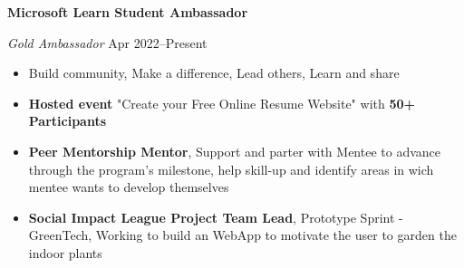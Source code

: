 \textbf{Microsoft Learn Student Ambassador \hfill } \par
\textit{Gold Ambassador}  \hfill Apr 2022--Present
\begin{itemize}
	\item Build community, Make a difference, Lead others, Learn and share
	\item \textbf{Hosted event} "Create your Free Online Resume Website" with \textbf{50+ Participants}
	\item \textbf{Peer Mentorship Mentor}, Support and parter with Mentee to advance through the program's milestone, help skill-up and identify areas in wich mentee wants to develop themselves
	\item \textbf{Social Impact League Project Team Lead}, Prototype Sprint - GreenTech, Working to build an WebApp to motivate the user to garden the indoor plants
\end{itemize}\par

